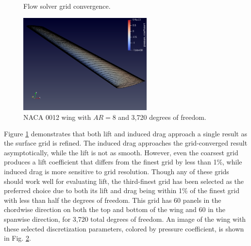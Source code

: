 \documentclass[11pt]{article}
\begin{document}
\begin{figure}
\centering
\caption{Flow solver grid convergence.}
\label{fig:solver_convergence}
\end{figure}

\begin{figure}
\centering
  \includegraphics[width=0.60\textwidth]{images/61x31_wing.png}
\caption{NACA 0012 wing with $AR=8$ and 3,720 degrees of freedom.}
\label{fig:61x31_wing}
\end{figure}

Figure \ref{fig:solver_convergence} demonstrates that both lift and induced drag
approach a single result as the surface grid is refined. The induced drag
approaches the grid-converged result asymptotically, while the lift is not as
smooth. However, even the coarsest grid produces a lift coefficient that
differs from the finest grid by less than 1\%, while induced drag is more
sensitive to grid resolution. Though any of these grids should work well for
evaluating lift, the third-finest grid has been selected as the preferred choice
due to both its lift and drag being within 1\% of the finest grid with less than
half the degrees of freedom. This grid has 60 panels in the chordwise
direction on both the top and bottom of the wing and 60 in the spanwise
direction, for 3,720 total degrees of freedom. An image of the wing with these
selected discretization parameters, colored by pressure coefficient, is shown in
Fig. \ref{fig:61x31_wing}.
\end{document}
